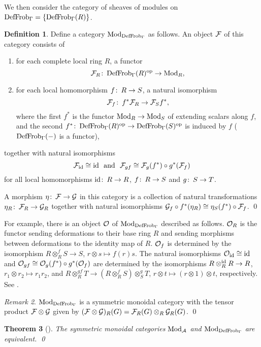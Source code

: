 \documentclass{gtpart}
\newtheorem{thm}{Theorem}
\theoremstyle{definition}
\newtheorem{defn}[thm]{Definition}
\theoremstyle{remark}
\newtheorem{rmk}[thm]{Remark}
\def\co{\colon\thinspace}
\newcommand{\CA}{{\cal A}}
\newcommand{\Mod}{{\rm Mod}}
\newcommand{\CO}{{\cal O}}
\newcommand{\DF}{{{\rm DefFrob}_\Gamma}}
\begin{document}
We then consider the category of sheaves of modules on $\DF = \{\DF(R)\}$.  
\begin{defn}
\label{def:mod}
 Define a category $\Mod_\DF$ as follows.  An object $\cal F$ of this category 
 consists of 
 \begin{enumerate}
  \item for each complete local ring $R$, a functor
  \[
  {\cal F}_R\co \DF(R)^{\rm op} \to \Mod_R, 
  \]
  \item for each local homomorphism $f\co R \to S$, a natural isomorphism 
  \[
  {\cal F}_f\co f^*{\cal F}_R \to {\cal F}_{S}f^*, 
  \]
  where the first $f^*$ is the functor $\Mod_R \to \Mod_{S}$ of extending 
  scalars along $f$, and the second 
  $f^*\co \DF(R)^{\rm op} \to \DF(S)^{\rm op}$ is induced by $f$ ($\DF(-)$ is 
  a functor), 
 \end{enumerate}
 together with natural isomorphisms 
 \[
  {\cal F}_{\rm id} \cong {\rm id}~~\text{and}~~ 
  {\cal F}_{gf} \cong {\cal F}_g(f^*) \circ g^*({\cal F}_f) 
 \]
 for all local homomorphisms ${\rm id}\co R \to R$, $f\co R \to S$ and 
 $g\co S \to T$.  

 A morphism $\eta\co {\cal F} \to {\cal G}$ in this category is a collection 
 of natural transformations $\eta_R\co {\cal F}_R \to {\cal G}_R$ together 
 with natural isomorphisms ${\cal G}_f \circ f^*(\eta_R) \cong 
 \eta_{S}(f^*) \circ {\cal F}_f$.  \qed
\end{defn}
For example, there is an object $\CO$ of $\Mod_\DF$ described as follows.  
$\CO_R$ is the functor sending deformations to their base ring $R$ and sending 
morphisms between deformations to the identity map of $R$.  $\CO_f$ is 
determined by the isomorphism $R \otimes_R^f S \to S$, 
$r \otimes s \mapsto f(r) s$.  The natural isomorphisms 
$\CO_{\rm id} \cong {\rm id}$ and $\CO_{gf} \cong \CO_g(f^*) \circ g^*(\CO_f)$ 
are determined by the isomorphisms $R \otimes_R^{\rm id} R \to R$, 
$r_1 \otimes r_2 \mapsto r_1 r_2$, and 
$R \otimes_R^{gf} T \to (R \otimes_R^f S) \otimes_S^g T$, 
$r \otimes t \mapsto (r \otimes 1) \otimes t$, respectively.  See 
\cite[11.13 and 11.17]{cong}.  
\begin{rmk}
 $\Mod_\DF$ is a symmetric monoidal category with the tensor product 
 ${\cal F} \otimes {\cal G}$ given by 
 $({\cal F} \otimes {\cal G})_R(G) = {\cal F}_R(G) \otimes_R {\cal G}_R(G)$.  
 \qed
\end{rmk}

\begin{thm}[{\cite[pre-theorem 16.4]{lpo}}]
 The symmetric monoidal categories $\Mod_\CA$ and $\Mod_\DF$ are equivalent.  
 \qed
\end{thm}
\end{document}
